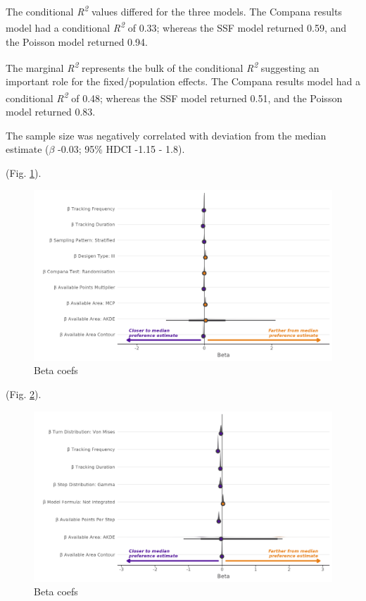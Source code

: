 \documentclass[10pt,a4paper]{article}
\begin{document}
The conditional \emph{R\textsuperscript{2}} values differed for the three models. The Compana results model had a conditional \emph{R\textsuperscript{2}} of 0.33; whereas the SSF model returned 0.59, and the Poisson model returned 0.94.

The marginal \emph{R\textsuperscript{2}} represents the bulk of the conditional \emph{R\textsuperscript{2}} suggesting an important role for the fixed/population effects. The Compana results model had a conditional \emph{R\textsuperscript{2}} of 0.48; whereas the SSF model returned 0.51, and the Poisson model returned 0.83.

The sample size was negatively correlated with deviation from the median estimate (\(\beta\) -0.03; 95\% HDCI -1.15 - 1.8).

(Fig. \ref{fig:effectPlotArea}).

\begin{figure}
\includegraphics[width=1\linewidth]{../figures/areaBrms_effectsPlot} \caption{Beta coefs}\label{fig:effectPlotArea}
\end{figure}

(Fig. \ref{fig:effectPlotSSF}).

\begin{figure}
\includegraphics[width=1\linewidth]{../figures/ssfBrms_effectsPlot} \caption{Beta coefs}\label{fig:effectPlotSSF}
\end{figure}
\end{document}
